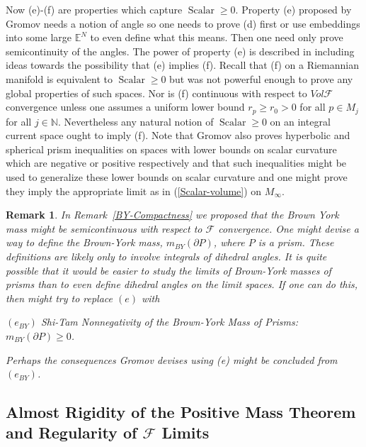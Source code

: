 \documentclass[12pt]{amsart}
\newtheorem{rmrk}[thm]{Remark}
\begin{document}
Now (e)-(f) are properties which capture ${\operatorname{Scalar}}\ge 0$.  Property (e) proposed by Gromov needs a notion of angle so one needs to prove (d) first or use embeddings
into some large $\mathbb{E}^N$ to even define what this means.  Then one need only prove semicontinuity of the angles.  The power of property (e) is described
in \cite{Gromov-Dirac} including ideas towards the possibility that (e) implies (f).  Recall that (f) on a Riemannian manifold is equivalent to ${\operatorname{Scalar}} \ge 0$ but was not powerful enough to prove any global properties of such spaces.  Nor is (f) continuous with respect
to $Vol\mathcal{F}$ convergence unless one assumes a uniform lower bound $r_p\ge r_0>0$ for all $p\in M_j$ for all $j \in {\mathbb{N}}$.    Nevertheless any
natural notion of ${\operatorname{Scalar}} \ge 0$ on an integral current space ought to imply (f).
Note that Gromov also proves hyperbolic and spherical prism
inequalities on spaces with lower bounds on scalar curvature which are negative or positive respectively and that such inequalities might be used to generalize these
lower bounds on scalar curvature and one might prove they imply
the appropriate limit as in (\ref{Scalar-volume}) on $M_\infty$.
 
 \begin{rmrk}
In Remark~\ref{BY-Compactness}
we proposed that the Brown York mass might
be semicontinuous with respect to $\mathcal{F}$ convergence.
One might devise a way to define the Brown-York 
mass, $m_{BY}(\partial P)$, where $P$ is a prism.   These definitions
are likely only to involve integrals of dihedral angles.   It is quite possible that it would be easier to study the limits of Brown-York
masses of prisms than to even define dihedral angles on the limit spaces.  
If one can do this, then might try to replace $(e)$ with 

\vspace{.2cm}
\noindent
$(e_{BY})$  Shi-Tam Nonnegativity of the Brown-York Mass of Prisms: $m_{BY}(\partial P)\ge 0$.
\vspace{.2cm}

\noindent
Perhaps
the consequences Gromov devises using (e) might be concluded from 
$(e_{BY})$.
\end{rmrk}

\subsection{Almost Rigidity of the Positive Mass Theorem and Regularity
of $\mathcal{F}$ Limits}
\end{document}
